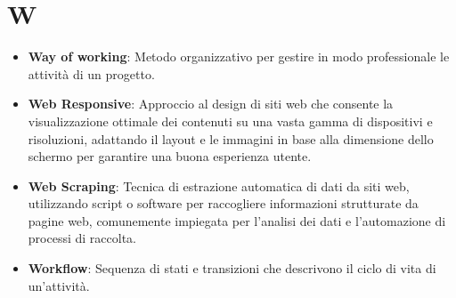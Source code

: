\section*{W}  
\begin{itemize}
    \item \textbf{Way of working}: Metodo organizzativo per gestire in modo professionale le attività di un progetto.
    \item \textbf{Web Responsive}: Approccio al design di siti web che consente la visualizzazione ottimale dei contenuti su una vasta gamma di dispositivi e risoluzioni, adattando il layout e le immagini in base alla dimensione dello schermo per garantire una buona esperienza utente.
    \item \textbf{Web Scraping}: Tecnica di estrazione automatica di dati da siti web, utilizzando script o software per raccogliere informazioni strutturate da pagine web, comunemente impiegata per l'analisi dei dati e l'automazione di processi di raccolta.
    \item \textbf{Workflow}: Sequenza di stati e transizioni che descrivono il ciclo di vita di un’attività.
\end{itemize}

